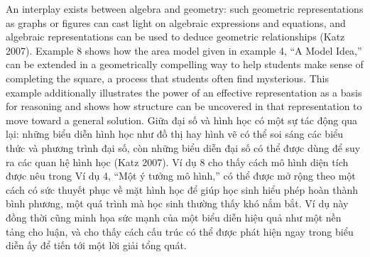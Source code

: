 \documentclass[
  10pt,
  a4paper,
  landscape,
  twoside,
  openany
]{scrbook}
\newcommand{\EN}[1]{#1}
\newcommand{\VI}[1]{#1}
\newcommand{\NOTE}[1]{#1}
\newcounter{example}
\begin{document}
\TriPara
{
\EN{An interplay exists between algebra and geometry: such geometric representations as graphs or figures can cast light on algebraic expressions and equations, and algebraic representations can be used to deduce geometric relationships (Katz 2007). Example 8 shows how the area model given in example 4, ``A Model Idea,'' can be extended in a geometrically compelling way to help students make sense of completing the square, a process that students often find mysterious. This example additionally illustrates the power of an effective representation as a basis for reasoning and shows how structure can be uncovered in that representation to move toward a general solution.}
}
{
\VI{Giữa đại số và hình học có một sự tác động qua lại: những biểu diễn hình học như đồ thị hay hình vẽ có thể soi sáng các biểu thức và phương trình đại số, còn những biểu diễn đại số có thể được dùng để suy ra các quan hệ hình học (Katz 2007). Ví dụ 8 cho thấy cách mô hình diện tích được nêu trong Ví dụ 4, ``Một ý tưởng mô hình,'' có thể được mở rộng theo một cách có sức thuyết phục về mặt hình học để giúp học sinh hiểu phép hoàn thành bình phương, một quá trình mà học sinh thường thấy khó nắm bắt. Ví dụ này đồng thời cũng minh họa sức mạnh của một biểu diễn hiệu quả như một nền tảng cho luận, và cho thấy cách cấu trúc có thể được phát hiện ngay trong biểu diễn ấy để tiến tới một lời giải tổng quát.}
}
{
\NOTE{}
}
\end{document}
